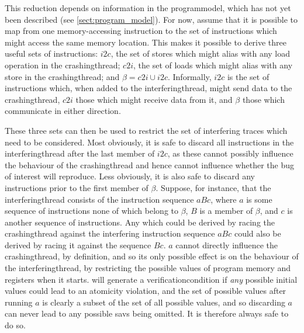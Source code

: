 This reduction depends on information in the \gls{programmodel}, which
has not yet been described (see \autoref{sect:program_model}).  For
now, assume that it is possible to map from one memory-accessing
instruction to the set of instructions which might access the same
memory location.  This makes it possible to derive three useful sets
of instructions: $i2c$, the set of stores which might alias with any
load operation in the \gls{crashingthread}; $c2i$, the set of loads
which might alias with any store in the \gls{crashingthread}; and
$\beta = c2i \cup i2c$.  Informally, $i2c$ is the set of instructions
which, when added to the \gls{interferingthread}, might send data to
the \gls{crashingthread}, $c2i$ those which might receive data from
it, and $\beta$ those which communicate in either direction.

These three sets can then be used to restrict the set of interfering
traces which need to be considered.  Most obviously, it is safe to
discard all instructions in the \gls{interferingthread} after the last
member of $i2c$, as these cannot possibly influence the behaviour of
the \gls{crashingthread} and hence cannot influence whether the bug of
interest will reproduce.  Less obviously, it is also safe to discard
any instructions prior to the first member of $\beta$.  Suppose, for
instance, that the \gls{interferingthread} consists of the instruction
sequence $aBc$, where $a$ is some sequence of instructions none of
which belong to $\beta$, $B$ is a member of $\beta$, and $c$ is
another sequence of instructions.  Any  which could
be derived by racing the \gls{crashingthread} {\StateMachine} against
the interfering instruction sequence $aBc$ could also be derived by
racing it against the sequence $Bc$.  $a$ cannot directly influence
the \gls{crashingthread}, by definition, and so its only possible
effect is on the behaviour of the \gls{interferingthread}, by
restricting the possible values of program memory and registers when
it starts.  {\Technique} will generate a \gls{verificationcondition}
if \emph{any} possible initial values could lead to an atomicity
violation, and the set of possible values after running $a$ is clearly
a subset of the set of all possible values, and so discarding $a$ can
never lead to any possible \glspl{sav} being omitted.  It is therefore
always safe to do so.

